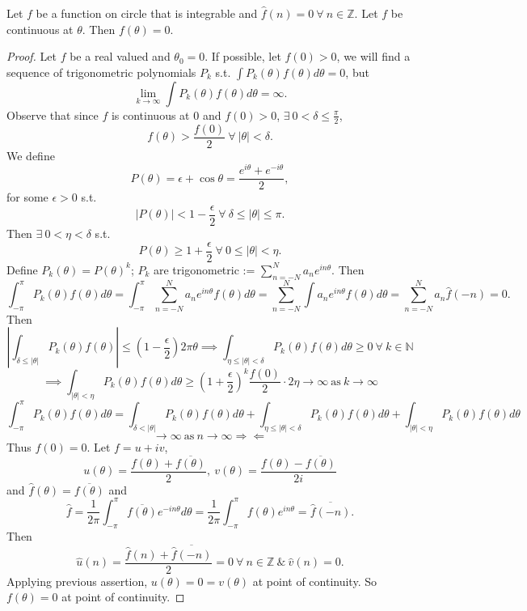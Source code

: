 \documentclass{functionspaces}
\begin{document}
\begin{theorem}\label{thm:fourier_uniqueness}
Let $f$ be a function on circle that is integrable and $\hat{f}(n)=0\ \forall\ n\in\mathbb{Z}$. Let $f$ be continuous at $\theta$. Then $f(\theta)=0$.
\end{theorem}

\begin{proof}
Let $f$ be a real valued and $\theta_{0}=0$. If possible, let $f(0)>0$, we will find a sequence of trigonometric polynomials $P_{k}$ s.t. $\int P_{k}(\theta)f(\theta)d\theta=0$, but
\[
\lim_{k\to\infty}\int P_{k}(\theta)f(\theta)d\theta=\infty.
\]
Observe that since $f$ is continuous at $0$ and $f(0)>0$, $\exists\ 0<\delta\leq\frac{\pi}{2}$,
\[
f(\theta)>\frac{f(0)}{2}\ \forall\ |\theta|<\delta.
\]
We define
\[
P(\theta)=\epsilon+\cos\theta=\frac{e^{i\theta}+e^{-i\theta}}{2},
\]
for some $\epsilon>0$ s.t.
\[
|P(\theta)|<1-\frac{\epsilon}{2}\ \forall\ \delta\leq|\theta|\leq\pi.
\]
Then $\exists\ 0<\eta<\delta$ s.t.
\[
P(\theta)\geq 1+\frac{\epsilon}{2}\ \forall\ 0\leq|\theta|<\eta.
\]
Define $P_{k}(\theta)=P(\theta)^{k}$; $P_{k}$ are trigonometric := $\sum_{n=-N}^{N}a_{n}e^{in\theta}$. Then
\[
\int_{-\pi}^{\pi}P_{k}(\theta)f(\theta)d\theta=\int_{-\pi}^{\pi}\sum_{n=-N}^{N}a_{n}e^{in\theta}f(\theta)d\theta=\sum_{n=-N}^{N}\int a_{n}e^{in\theta}f(\theta)d\theta=\sum_{n=-N}^{N}a_{n}\hat{f}(-n)=0.
\]
Then
\[
\left|\int_{\delta\leq|\theta|}P_{k}(\theta)f(\theta)\right|\leq\left(1-\frac{\epsilon}{2}\right)2\pi\theta\implies\int_{\eta\leq|\theta|<\delta}P_{k}(\theta)f(\theta)d\theta\geq 0\ \forall\ k\in\mathbb{N}
\]
\[
\implies\int_{|\theta|<\eta}P_{k}(\theta)f(\theta)d\theta\geq\left(1+\frac{\epsilon}{2}\right)^{k}\frac{f(0)}{2}\cdot 2\eta\rightarrow\infty\ \text{as}\ k\rightarrow\infty
\]
\[
\int_{-\pi}^{\pi}P_{k}(\theta)f(\theta)d\theta=\int_{\delta<|\theta|}P_{k}(\theta)f(\theta)d\theta+\int_{\eta\leq|\theta|<\delta}P_{k}(\theta)f(\theta)d\theta+\int_{|\theta|<\eta}P_{k}(\theta)f(\theta)d\theta
\]
\[
\rightarrow\infty\ \text{as}\ n\rightarrow\infty\Rightarrow\Leftarrow
\]
Thus $f(0)=0$. Let $f=u+iv$,
\[
u(\theta)=\frac{f(\theta)+\overline{f(\theta)}}{2},\ v(\theta)=\frac{f(\theta)-\overline{f(\theta)}}{2i}
\]
and $\hat{f}(\theta)=\overline{f(\theta)}$ and
\[
\hat{f}=\frac{1}{2\pi}\int_{-\pi}^{\pi}\overline{f(\theta)}e^{-in\theta}d\theta=\frac{1}{2\pi}\int_{-\pi}^{\pi}f(\theta)e^{in\theta}=\overline{\hat{f}(-n)}.
\]
Then
\[
\hat{u}(n)=\frac{\hat{f}(n)+\overline{\hat{f}(-n)}}{2}=0\ \forall\ n\in\mathbb{Z}\ \&\ \hat{v}(n)=0.
\]
Applying previous assertion, $u(\theta)=0=v(\theta)$ at point of continuity. So $f(\theta)=0$ at point of continuity.
\end{proof}
\end{document}
